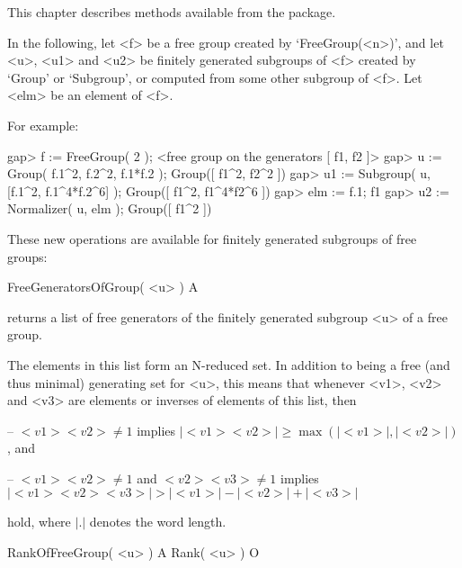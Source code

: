 


This chapter describes methods available from the {\FGA} package.

In the following, let <f> be a free group created by `FreeGroup(<n>)',
and let <u>, <u1> and <u2> be finitely generated subgroups of <f>
created by `Group' or `Subgroup', or computed from some other subgroup
of <f>.  Let <elm> be an element of <f>.

For example:

\beginexample
gap> f := FreeGroup( 2 );                                             
<free group on the generators [ f1, f2 ]>
gap> u := Group( f.1^2, f.2^2, f.1*f.2 );
Group([ f1^2, f2^2 ])
gap> u1 := Subgroup( u, [f.1^2, f.1^4*f.2^6] );
Group([ f1^2, f1^4*f2^6 ])
gap> elm := f.1;
f1
gap> u2 := Normalizer( u, elm );
Group([ f1^2 ])
\endexample


These new operations are available for finitely generated subgroups of
free groups:

\>FreeGeneratorsOfGroup( <u> ) A

returns a list of free generators of the finitely generated subgroup
<u> of a free group.

The elements in this list form an N-reduced set.  In addition to
being a free (and thus minimal) generating set for <u>, this means
that whenever <v1>, <v2> and <v3> are elements or inverses of elements
of this list, then

\beginlist%
  \item{--}
    $<v1><v2>\neq1$ implies $|<v1><v2>|\geq\max(|<v1>|, |<v2>|)$, and
  \item{--}
    $<v1><v2>\neq1$ and $<v2><v3>\neq1$ implies
    $|<v1><v2><v3>| > |<v1>| - |<v2>| + |<v3>|$
\endlist

hold, where $|.|$ denotes the word length.

\>RankOfFreeGroup( <u> ) A
\>Rank( <u> ) O

